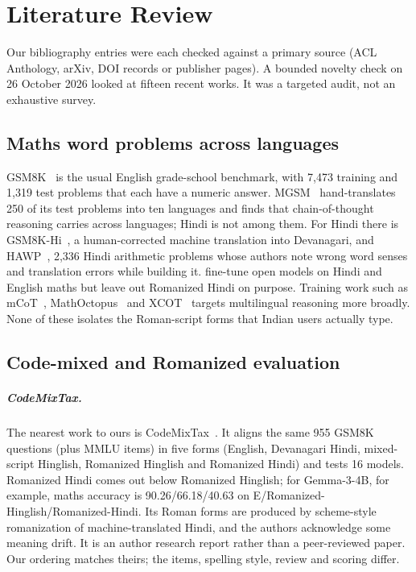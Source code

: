 \documentclass[12pt,a4paper,oneside]{report}
\renewcommand{\_}{\oldunderscore\allowbreak}
\begin{document}
\chapter{Literature Review}
\label{ch:lit}

Our bibliography entries were each checked against a primary source (ACL Anthology, arXiv, DOI records or publisher pages). A bounded novelty check on 26 October 2026 looked at fifteen recent works. It was a targeted audit, not an exhaustive survey.

\section{Maths word problems across languages}

GSM8K~\citep{cobbe-etal-2021-gsm8k} is the usual English grade-school benchmark, with 7,473 training and 1,319 test problems that each have a numeric answer. MGSM~\citep{shi-etal-2023-mgsm} hand-translates 250 of its test problems into ten languages and finds that chain-of-thought reasoning carries across languages; Hindi is not among them. For Hindi there is GSM8K-Hi~\citep{kamath-etal-2025-benchmarking}, a human-corrected machine translation into Devanagari, and HAWP~\citep{sharma-etal-2022-hawp}, 2,336 Hindi arithmetic problems whose authors note wrong word senses and translation errors while building it. \citet{anand-etal-2025-multilingual} fine-tune open models on Hindi and English maths but leave out Romanized Hindi on purpose. Training work such as mCoT~\citep{lai-nissim-2024-mcot}, MathOctopus~\citep{chen-etal-2024-breaking} and XCOT~\citep{chai-etal-2025-xcot} targets multilingual reasoning more broadly. None of these isolates the Roman-script forms that Indian users actually type.

\section{Code-mixed and Romanized evaluation}

\paragraph{CodeMixTax.} The nearest work to ours is CodeMixTax~\citep{sthanika-2026-codemix}. It aligns the same 955 GSM8K questions (plus MMLU items) in five forms (English, Devanagari Hindi, mixed-script Hinglish, Romanized Hinglish and Romanized Hindi) and tests 16 models. Romanized Hindi comes out below Romanized Hinglish; for Gemma-3-4B, for example, maths accuracy is 90.26/66.18/40.63 on E/Romanized-Hinglish/Romanized-Hindi. Its Roman forms are produced by scheme-style romanization of machine-translated Hindi, and the authors acknowledge some meaning drift. It is an author research report rather than a peer-reviewed paper. Our ordering matches theirs; the items, spelling style, review and scoring differ.
\end{document}
